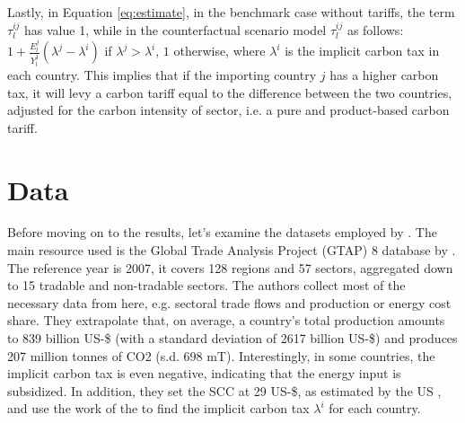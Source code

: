 Lastly, in Equation \ref{eq:estimate}, in the benchmark case without tariffs, the term $\tau_l^{ij}$ has value 1, while in the counterfactual scenario \textcite{Larch2017} model $\tau_l^{ij}$ as follows: $1+\frac{E_l^j}{Y_l^j}(\lambda^j-\lambda^i)$ if $\lambda^j>\lambda^i$, $1$ otherwise, where $\lambda^i$ is the implicit carbon tax in each country. This implies that if the importing country $j$ has a higher carbon tax, it will levy a carbon tariff equal to the difference between the two countries, adjusted for the carbon intensity of sector, i.e. a pure and product-based carbon tariff.

\section{Data}\label{sec:data}

Before moving on to the results, let's examine the datasets employed by \textcite{Larch2017}. The main resource used is the Global Trade Analysis Project (GTAP) 8 database by \textcite{Narayanan2012}. The reference year is 2007, it covers 128 regions and 57 sectors, aggregated down to 15 tradable and non-tradable sectors. The authors collect most of the necessary data from here, e.g. sectoral trade flows and production or energy cost share. They extrapolate that, on average, a country's total production amounts to 839 billion US-\$ (with a standard deviation of 2617 billion US-\$) and produces 207 million tonnes of CO2 (s.d. 698 mT). Interestingly, in some countries, the implicit carbon tax is even negative, indicating that the energy input is subsidized. In addition, they set the SCC at 29 US-\$, as estimated by the US \textcite{SCC200}, and use the work of the \textcite{OECD2016} to find the implicit carbon tax $\lambda^i$ for each country.




